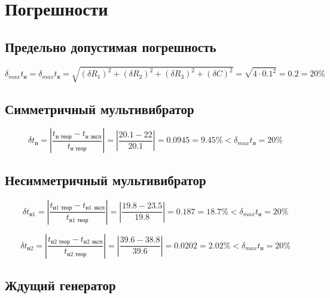 \newpage

\section{Погрешности}

\subsection{Предельно допустимая погрешность}

\begin{displaymath}
	\delta_{max} t_{\text{и}} = \delta_{max} t_{\text{в}} =\sqrt{(\delta R_1)^2 + (\delta R_2)^2 + (\delta R_3)^2 + (\delta C)^2} = \sqrt{4 \cdot 0.1^2} = 0.2 = 20 \%
\end{displaymath}

\subsection{Симметричный мультивибратор}

\begin{displaymath}
	\delta t_{\text{и}} = \left| \frac{t_{\text{и теор}} - t_{\text{и эксп}}}{t_{\text{и теор}}} \right| = \left| \frac{20.1 - 22}{20.1} \right| = 0.0945 = 9.45 \% < \delta_{max} t_{\text{и}} = 20 \%
\end{displaymath}

\subsection{Несимметричный мультивибратор}

\begin{displaymath}
	\delta t_{\text{и1}} = \left| \frac{t_{\text{и1 теор}} - t_{\text{и1 эксп}}}{t_{\text{и1 теор}}} \right| = \left| \frac{19.8 - 23.5}{19.8} \right| = 0.187 = 18.7 \% < \delta_{max} t_{\text{и}} = 20 \%
\end{displaymath}

\begin{displaymath}
	\delta t_{\text{и2}} = \left| \frac{t_{\text{и2 теор}} - t_{\text{и2 эксп}}}{t_{\text{и2 теор}}} \right| = \left| \frac{39.6 - 38.8}{39.6} \right| = 0.0202 = 2.02 \% < \delta_{max} t_{\text{и}} = 20 \%
\end{displaymath}

\subsection{Ждущий генератор}


